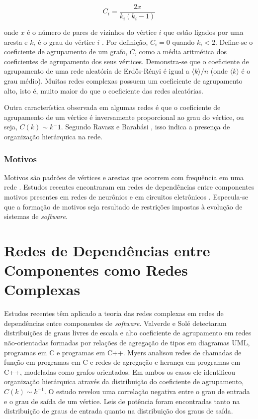 \documentclass{article}
\begin{document}
\[  C_i = \frac{2x}{k_i(k_i - 1)} \]

onde $x$ é o número de pares de vizinhos do vértice $i$ que estão ligados por uma aresta e $k_i$ é o grau do vértice $i$ \cite{Watts1998}. Por definição, $C_i = 0$ quando $k_i < 2$. Define-se o coeficiente de agrupamento de um grafo, $C$, como a média aritmética dos coeficientes de agrupamento dos seus vértices. Demonstra-se que o coeficiente de agrupamento de uma rede aleatória de Erdős-Rényi é igual a $\langle k \rangle / n$ (onde $\langle k \rangle$ é o grau médio). Muitas redes complexas possuem um coeficiente de agrupamento alto, isto é, muito maior do que o coeficiente das redes aleatórias.

Outra característica observada em algumas redes é que o coeficiente de agrupamento de um vértice é inversamente proporcional ao grau do vértice, ou seja, $C(k) \sim k^-1$. Segundo Ravasz e Barabási \cite{Ravasz2003}, isso indica a presença de organização hierárquica na rede.

\subsubsection{Motivos}

Motivos são padrões de vértices e arestas que ocorrem com frequência em uma rede \cite{Milo2002}. Estudos recentes encontraram em redes de dependências entre componentes motivos presentes em redes de neurônios e em circuitos eletrônicos \cite{Valverde2005,Ma2008}. Especula-se que a formação de motivos seja resultado de restrições impostas à evolução de sistemas de \textit{software}.


\section{Redes de Dependências entre Componentes como Redes Complexas}

Estudos recentes têm aplicado a teoria das redes complexas em redes de dependências entre componentes de \textit{software}. Valverde e Solé \cite{Valverde2003} detectaram distribuições de graus livres de escala e alto coeficiente de agrupamento em redes não-orientadas formadas por relações de agregação de tipos em diagramas UML, programas em C e programas em C++. Myers \cite{Myers2003} analisou redes de chamadas de função em programas em C e redes de agregação e herança em programas em C++, modeladas como grafos orientados. Em ambos os casos ele identificou organização hierárquica através da distribuição do coeficiente de agrupamento, $C(k) \sim k^{-1}$. O estudo revelou uma correlação negativa entre o grau de entrada e o grau de saída de um vértice. Leis de potência foram encontradas tanto na distribuição de graus de entrada quanto na distribuição dos graus de saída.
\end{document}
